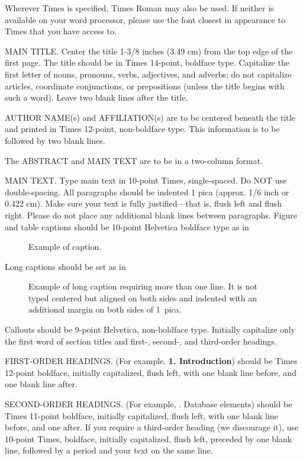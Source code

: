 \documentclass[times, 10pt,twocolumn]{article}
\begin{document}

Wherever Times is specified, Times Roman may also be used. If neither is 
available on your word processor, please use the font closest in 
appearance to Times that you have access to.

MAIN TITLE. Center the title 1-3/8 inches (3.49 cm) from the top edge of 
the first page. The title should be in Times 14-point, boldface type. 
Capitalize the first letter of nouns, pronouns, verbs, adjectives, and 
adverbs; do not capitalize articles, coordinate conjunctions, or 
prepositions (unless the title begins with such a word). Leave two blank 
lines after the title.

AUTHOR NAME(s) and AFFILIATION(s) are to be centered beneath the title 
and printed in Times 12-point, non-boldface type. This information is to 
be followed by two blank lines.

The ABSTRACT and MAIN TEXT are to be in a two-column format. 

MAIN TEXT. Type main text in 10-point Times, single-spaced. Do NOT use 
double-spacing. All paragraphs should be indented 1 pica (approx. 1/6 
inch or 0.422 cm). Make sure your text is fully justified---that is, 
flush left and flush right. Please do not place any additional blank 
lines between paragraphs. Figure and table captions should be 10-point 
Helvetica boldface type as in
\begin{figure}[h]
   \caption{Example of caption.}
\end{figure}

\noindent Long captions should be set as in 
\begin{figure}[h] 
   \caption{Example of long caption requiring more than one line. It is 
     not typed centered but aligned on both sides and indented with an 
     additional margin on both sides of 1~pica.}
\end{figure}

\noindent Callouts should be 9-point Helvetica, non-boldface type. 
Initially capitalize only the first word of section titles and first-, 
second-, and third-order headings.

FIRST-ORDER HEADINGS. (For example, {\large \bf 1. Introduction}) 
should be Times 12-point boldface, initially capitalized, flush left, 
with one blank line before, and one blank line after.

SECOND-ORDER HEADINGS. (For example, {. Database elements}) 
should be Times 11-point boldface, initially capitalized, flush left, 
with one blank line before, and one after. If you require a third-order 
heading (we discourage it), use 10-point Times, boldface, initially 
capitalized, flush left, preceded by one blank line, followed by a period 
and your text on the same line.
\end{document}
